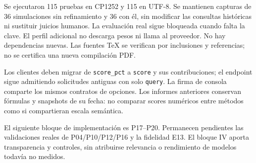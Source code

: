 Se ejecutaron 115 pruebas en CP1252 y 115 en UTF-8. Se mantienen capturas de
36 simulaciones sin refinamiento y 36 con él, sin modificar las consultas
históricas ni sustituir juicios humanos. La evaluación real sigue bloqueada
cuando falta la clave. El perfil adicional no descarga pesos ni llama al
proveedor. No hay dependencias nuevas. Las fuentes TeX se verifican por
inclusiones y referencias; no se certifica una nueva compilación PDF.

Los clientes deben migrar de \texttt{score\_pct} a \texttt{score} y sus
contribuciones; el endpoint sigue admitiendo solicitudes antiguas con solo
\texttt{query}. La firma de consola comparte los mismos contratos de opciones.
Los informes anteriores conservan fórmulas y snapshots de su fecha: no comparar
scores numéricos entre métodos como si compartieran escala semántica.

El siguiente bloque de implementación es P17--P20. Permanecen pendientes las
validaciones reales de P04/P10/P12/P16 y la fidelidad E13. El bloque IV aporta
transparencia y controles, sin atribuirse relevancia o rendimiento de modelos
todavía no medidos.
